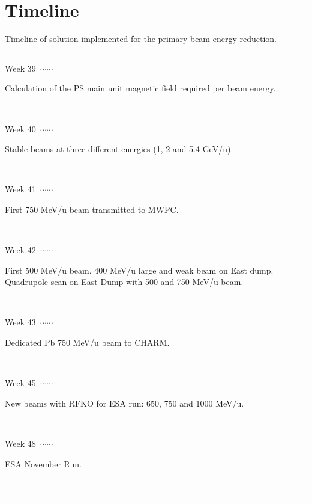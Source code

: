 \documentclass{cernatsnote}
\newcommand\ytl[2]{%
  \parbox[b]{8em}{\hfill{\color{black}#1}~$\cdots\cdots$~}%
  \makebox[0pt][c]{$\bullet$}\vrule\quad%
  \parbox[c]{8.5cm}{\vspace{7pt}\color{black}\raggedright #2.\\[7pt]}\\[-3pt]%
}
\begin{document}
\section{Timeline}

\begin{table}[H]
\caption{Timeline of solution implemented for the primary beam energy reduction.}
\centering
\begin{minipage}[t]{.7\linewidth}
\color{gray}
\rule{\linewidth}{1pt}
\ytl{Week 39}{Calculation of the PS main unit magnetic field required per beam energy}
\ytl{Week 40}{Stable beams at three different energies (1, 2 and 5.4 GeV/u)}
\ytl{Week 41}{First 750 MeV/u beam transmitted to MWPC}
\ytl{Week 42}{First 500 MeV/u beam. 400 MeV/u large and weak beam on East dump. Quadrupole scan on East Dump with 500 and 750 MeV/u beam}
\ytl{Week 43}{Dedicated Pb 750 MeV/u beam to CHARM}
\ytl{Week 45}{New beams with RFKO for ESA run: 650, 750 and 1000 MeV/u}
\ytl{Week 48}{ESA November Run}
\bigskip
\rule{\linewidth}{1pt}%
\end{minipage}%
\end{table}



\end{document}
